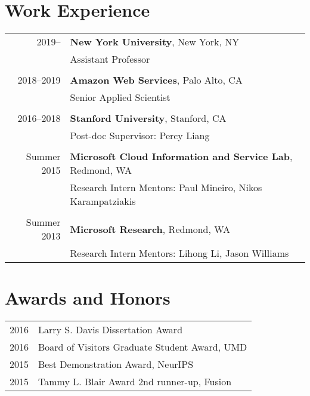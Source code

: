 \documentclass[a4paper,11pt]{article}
\begin{document}
\section{Work Experience}
\begin{tabular}{rl}    
2019--   & \textbf{New York University}, New York, NY \\
    & Assistant Professor \\
\\
2018--2019  & \textbf{Amazon Web Services}, Palo Alto, CA \\
    & Senior Applied Scientist \\
\\
2016--2018 & \textbf{Stanford University}, Stanford, CA\\
& Post-doc \hspace{2em} Supervisor: Percy Liang \\
\\
Summer 2015 & {\bf Microsoft Cloud Information and Service Lab}, Redmond, WA\\
& Research Intern \hspace{2em} Mentors: Paul Mineiro, Nikos Karampatziakis\\
\\
Summer 2013 & {\bf Microsoft Research}, Redmond, WA\\
& Research Intern \hspace{2em} Mentors: Lihong Li, Jason Williams
\end{tabular}

\section{Awards and Honors}
\begin{tabular}{rl}    
2016 & Larry S. Davis Dissertation Award\\
2016 & Board of Visitors Graduate Student Award, UMD\\
2015 & Best Demonstration Award, NeurIPS\\
2015 & Tammy L. Blair Award 2nd runner-up, Fusion\\
\end{tabular}
\end{document}
